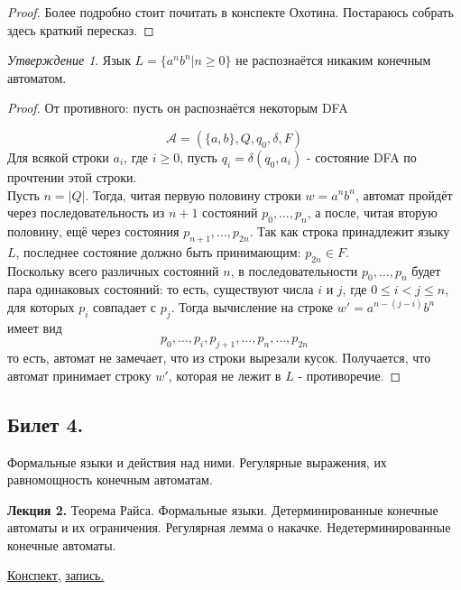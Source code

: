 \documentclass[a4paper]{article}
\newcommand{\mybox}{%
    \collectbox{%
        \setlength{\fboxsep}{1pt}%
        \fbox{\BOXCONTENT}%
    }%
}
\theoremstyle{indented}
\theoremstyle{definition}
\theoremstyle{remark}
\newtheorem{stat}{Утверждение}
\begin{document}
\begin{proof}
    Более подробно стоит почитать в конспекте Охотина. Постараюсь собрать здесь краткий пересказ.
\end{proof}

\begin{stat}
    Язык $L = \{ a^n b^n | n \geq 0 \}$ не распознаётся никаким конечным автоматом.
\end{stat}

\begin{proof}
    От противного: пусть он распознаётся некоторым DFA 
    
    $$\mathcal{A} = (\{a,b\},Q,q_0, \delta ,F)$$ Для всякой строки $a_i$, где $i \geq 0$, пусть $q_i = \delta (q_0,a_i)$ - состояние DFA по прочтении этой строки. \\ 

    Пусть $n = |Q|$. Тогда, читая первую половину строки $w = a^nb^n$, автомат пройдёт через последовательность из $n+1$ состояний $p_0, \ldots, p_n$, а после, читая вторую половину, ещё через состояния $p_{n+1}, \ldots, p_{2n}$. Так как строка принадлежит языку $L$, последнее состояние должно быть принимающим: $p_{2n} \in F$. \\ 

    Поскольку всего различных состояний $n$, в последовательности $p_0, \ldots, p_n$ будет пара одинаковых состояний: то есть, существуют числа $i$ и $j$, где $0 \leq i < j \leq n$, для которых $p_i$ совпадает с $p_j$. Тогда вычисление на строке $w' =a^{n-(j-i)}b^n$ имеет вид $$p_0, \ldots ,p_i,p_{j+1}, \ldots,p_n, \ldots,p_{2n}$$ то есть, автомат не замечает, что из строки вырезали кусок. Получается, что автомат принимает строку $w'$, которая не лежит в $L$ - противоречие.
\end{proof}



\newpage 

\subsection{Билет 4.}

Формальные языки и действия над ними. Регулярные выражения, их равномощность конечным автоматам.

\hrulefill

\textbf{Лекция 2.} Теорема Райса. Формальные языки. Детерминированные конечные автоматы и их ограничения. Регулярная лемма о накачке. Недетерминированные конечные автоматы.

\begin{flushright}
    \mybox{
        \href{https://users.math-cs.spbu.ru/~okhotin/teaching/tcs_fl_2021/okhotin_tcs_fl_2021_l2.pdf}{Конспект,}
        \href{https://disk.yandex.ru/d/knoQ44wLmGDwwQ/2021-2022%20учебный%20год%20(осенний%20семестр)/2%20курс/Теоретическая%20информатика/Теор%20информатика%2C%202%20курс%2C%20лекция%2C%20%2008.09.2021.mp4}{запись.}
    }
\end{flushright}
\end{document}
